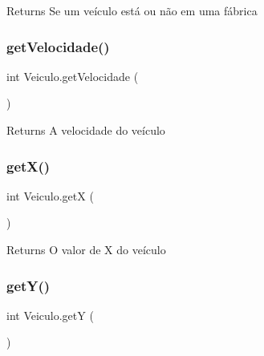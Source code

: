 \begin{DoxyReturn}{Returns}
Se um veículo está ou não em uma fábrica 
\end{DoxyReturn}
\mbox{\label{classVeiculo_a29ede179017c05f28aebf02922a5478b}} 
\subsubsection{\texorpdfstring{get\+Velocidade()}{getVelocidade()}}
{\footnotesize\ttfamily int Veiculo.\+get\+Velocidade (\begin{DoxyParamCaption}{ }\end{DoxyParamCaption})\hspace{0.3cm}{\ttfamily [inline]}}

\begin{DoxyReturn}{Returns}
A velocidade do veículo 
\end{DoxyReturn}
\mbox{\label{classVeiculo_a235b29e1e25ec8c769b20fb2aeba8404}} 
\subsubsection{\texorpdfstring{get\+X()}{getX()}}
{\footnotesize\ttfamily int Veiculo.\+getX (\begin{DoxyParamCaption}{ }\end{DoxyParamCaption})\hspace{0.3cm}{\ttfamily [inline]}}

\begin{DoxyReturn}{Returns}
O valor de X do veículo 
\end{DoxyReturn}
\mbox{\label{classVeiculo_a06b2a923e51186673a016f75d10363d3}} 
\subsubsection{\texorpdfstring{get\+Y()}{getY()}}
{\footnotesize\ttfamily int Veiculo.\+getY (\begin{DoxyParamCaption}{ }\end{DoxyParamCaption})\hspace{0.3cm}{\ttfamily [inline]}}

